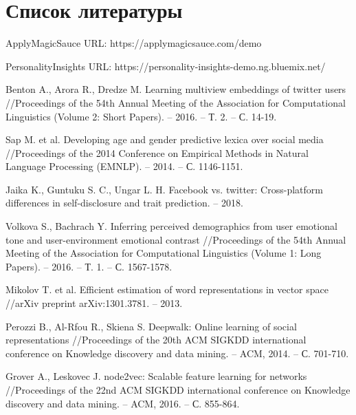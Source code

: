 \section{Список литературы}

\begingroup
\let\clearpage\relax
\vskip-3cm
\begin{thebibliography}{9}

ApplyMagicSauce URL: https://applymagicsauce.com/demo

PersonalityInsights URL: https://personality-insights-demo.ng.bluemix.net/

Benton A., Arora R., Dredze M. Learning multiview embeddings of twitter users //Proceedings of the 54th Annual Meeting of the Association for Computational Linguistics (Volume 2: Short Papers). – 2016. – Т. 2. – С. 14-19.

Sap M. et al. Developing age and gender predictive lexica over social media //Proceedings of the 2014 Conference on Empirical Methods in Natural Language Processing (EMNLP). – 2014. – С. 1146-1151.

Jaika K., Guntuku S. C., Ungar L. H. Facebook vs. twitter: Cross-platform differences in self-disclosure and trait prediction. – 2018.

Volkova S., Bachrach Y. Inferring perceived demographics from user emotional tone and user-environment emotional contrast //Proceedings of the 54th Annual Meeting of the Association for Computational Linguistics (Volume 1: Long Papers). – 2016. – Т. 1. – С. 1567-1578.

Mikolov T. et al. Efficient estimation of word representations in vector space //arXiv preprint arXiv:1301.3781. – 2013.

Perozzi B., Al-Rfou R., Skiena S. Deepwalk: Online learning of social representations //Proceedings of the 20th ACM SIGKDD international conference on Knowledge discovery and data mining. – ACM, 2014. – С. 701-710.

Grover A., Leskovec J. node2vec: Scalable feature learning for networks //Proceedings of the 22nd ACM SIGKDD international conference on Knowledge discovery and data mining. – ACM, 2016. – С. 855-864.


\end{thebibliography}

